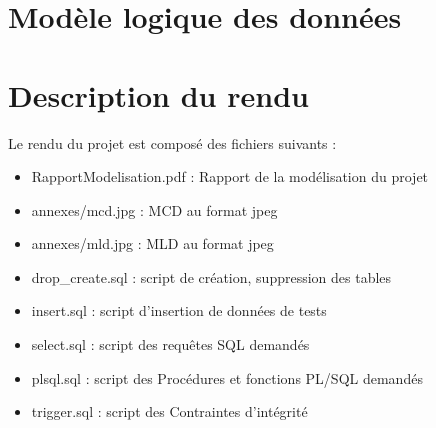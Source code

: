 \documentclass[12pt]{article}
\begin{document}
\section{Modèle logique des données}
\vspace{5mm}
\center
{}

\section{Description du rendu}
Le rendu du projet est composé des fichiers suivants :
\begin{itemize}
\item RapportModelisation.pdf : Rapport de la modélisation du projet
\item annexes/mcd.jpg : MCD au format jpeg
\item annexes/mld.jpg : MLD au format jpeg
\item drop\_create.sql : script de création, suppression des tables
\item insert.sql : script d'insertion de données de tests
\item select.sql : script des requêtes SQL demandés
\item plsql.sql : script des Procédures et fonctions PL/SQL demandés
\item trigger.sql : script des Contraintes d’intégrité
\end{itemize}
\end{document}
